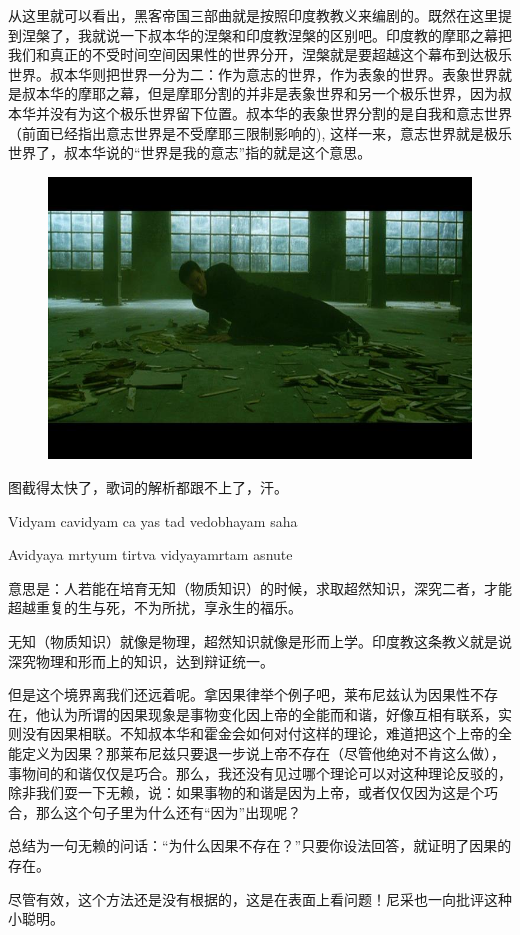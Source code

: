 \documentclass[UTF8]{ctexart}
\newenvironment{myquote}{\color{green} \setlength{\leftskip}{6em} \setlength{\rightskip}{4em} \setlength{\parindent}{-2em}}{\par}
\begin{document}
从这里就可以看出，黑客帝国三部曲就是按照印度教教义来编剧的。既然在这里提到涅槃了，我就说一下叔本华的涅槃和印度教涅槃的区别吧。印度教的摩耶之幕把我们和真正的不受时间空间因果性的世界分开，涅槃就是要超越这个幕布到达极乐世界。叔本华则把世界一分为二：作为意志的世界，作为表象的世界。表象世界就是叔本华的摩耶之幕，但是摩耶分割的并非是表象世界和另一个极乐世界，因为叔本华并没有为这个极乐世界留下位置。叔本华的表象世界分割的是自我和意志世界（前面已经指出意志世界是不受摩耶三限制影响的), 这样一来，意志世界就是极乐世界了，叔本华说的“世界是我的意志”指的就是这个意思。

\begin{figure}[htb]
\centering
\includegraphics[width=0.5\linewidth]{fig/41482934a748363a5ab5f553.jpg}
\end{figure}

图截得太快了，歌词的解析都跟不上了，汗。

\begin{myquote}
Vidyam cavidyam ca yas tad vedobhayam saha

Avidyaya mrtyum tirtva vidyayamrtam asnute
\end{myquote}

意思是：人若能在培育无知（物质知识）的时候，求取超然知识，深究二者，才能超越重复的生与死，不为所扰，享永生的福乐。

无知（物质知识）就像是物理，超然知识就像是形而上学。印度教这条教义就是说深究物理和形而上的知识，达到辩证统一。

但是这个境界离我们还远着呢。拿因果律举个例子吧，莱布尼兹认为因果性不存在，他认为所谓的因果现象是事物变化因上帝的全能而和谐，好像互相有联系，实则没有因果相联。不知叔本华和霍金会如何对付这样的理论，难道把这个上帝的全能定义为因果？那莱布尼兹只要退一步说上帝不存在（尽管他绝对不肯这么做），事物间的和谐仅仅是巧合。那么，我还没有见过哪个理论可以对这种理论反驳的，除非我们耍一下无赖，说：如果事物的和谐是因为上帝，或者仅仅因为这是个巧合，那么这个句子里为什么还有“因为”出现呢？

总结为一句无赖的问话：“为什么因果不存在？”只要你设法回答，就证明了因果的存在。

尽管有效，这个方法还是没有根据的，这是在表面上看问题！尼采也一向批评这种小聪明。
\end{document}
